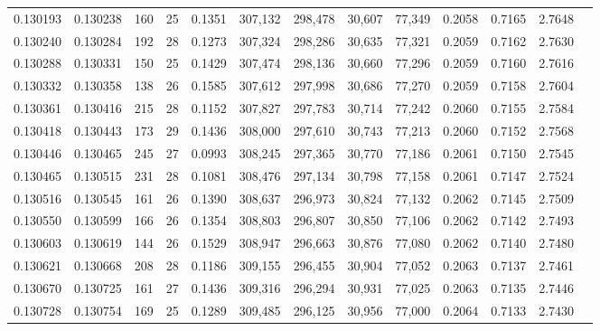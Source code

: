 \begin{tabular}{rrrrrrrrrrrrr}
0.130193 & 0.130238 & 160 &  25 &                                     0.1351 & 307,132 & 298,478 &  30,607 &  77,349 & 0.2058 & 0.7165 & 2.7648 \\
0.130240 & 0.130284 & 192 &  28 &                                     0.1273 & 307,324 & 298,286 &  30,635 &  77,321 & 0.2059 & 0.7162 & 2.7630 \\
0.130288 & 0.130331 & 150 &  25 &                                     0.1429 & 307,474 & 298,136 &  30,660 &  77,296 & 0.2059 & 0.7160 & 2.7616 \\
0.130332 & 0.130358 & 138 &  26 &                                     0.1585 & 307,612 & 297,998 &  30,686 &  77,270 & 0.2059 & 0.7158 & 2.7604 \\
0.130361 & 0.130416 & 215 &  28 &                                     0.1152 & 307,827 & 297,783 &  30,714 &  77,242 & 0.2060 & 0.7155 & 2.7584 \\
0.130418 & 0.130443 & 173 &  29 &                                     0.1436 & 308,000 & 297,610 &  30,743 &  77,213 & 0.2060 & 0.7152 & 2.7568 \\
0.130446 & 0.130465 & 245 &  27 &                                     0.0993 & 308,245 & 297,365 &  30,770 &  77,186 & 0.2061 & 0.7150 & 2.7545 \\
0.130465 & 0.130515 & 231 &  28 &                                     0.1081 & 308,476 & 297,134 &  30,798 &  77,158 & 0.2061 & 0.7147 & 2.7524 \\
0.130516 & 0.130545 & 161 &  26 &                                     0.1390 & 308,637 & 296,973 &  30,824 &  77,132 & 0.2062 & 0.7145 & 2.7509 \\
0.130550 & 0.130599 & 166 &  26 &                                     0.1354 & 308,803 & 296,807 &  30,850 &  77,106 & 0.2062 & 0.7142 & 2.7493 \\
0.130603 & 0.130619 & 144 &  26 &                                     0.1529 & 308,947 & 296,663 &  30,876 &  77,080 & 0.2062 & 0.7140 & 2.7480 \\
0.130621 & 0.130668 & 208 &  28 &                                     0.1186 & 309,155 & 296,455 &  30,904 &  77,052 & 0.2063 & 0.7137 & 2.7461 \\
0.130670 & 0.130725 & 161 &  27 &                                     0.1436 & 309,316 & 296,294 &  30,931 &  77,025 & 0.2063 & 0.7135 & 2.7446 \\
0.130728 & 0.130754 & 169 &  25 &                                     0.1289 & 309,485 & 296,125 &  30,956 &  77,000 & 0.2064 & 0.7133 & 2.7430 \\

\end{tabular}
